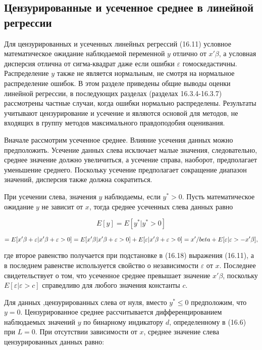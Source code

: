 \subsection{Цензурированные и усеченное среднее в линейной регрессии}


Для цензурированных и усеченных линейных регрессий (16.11) условное математическое ожидание наблюдаемой переменной $y$ отлично от $x'\beta$, а условная дисперсия отлична от сигма-квадрат даже если ошибки $\varepsilon$ гомоскедастичны. Распределение $y$ также не является нормальным, не смотря на нормальное распределение ошибок. В этом разделе приведены общие выводы оценки линейной регрессии, в последующих разделах (разделах 16.3.4-16.3.7) рассмотрены частные случаи, когда ошибки нормально распределены. Результаты учитывают цензурирование и усечение и являются основой для методов, не входящих в группу методов максимального правдоподобия оценивания.

Вначале рассмотрим усеченное среднее. Влияние усечения данных можно предположить. Усечение данных слева исключает малые значения, следовательно, среднее значение должно увеличиться, а усечение справа, наоборот, предполагает уменьшение среднего. Поскольку усечение предполагает сокращение диапазон значений, дисперсия также должна сократиться.

При усечении слева, значения $y$ наблюдаемы, если $y^{*}>0$. Пусть математическое ожидание $y$ не зависит от $x$, тогда среднее усеченных слева данных равно

\begin{equation}
E[y]=E[y^{*}|y^{*}>0]
\end{equation}

\[
=E[x'\beta+\varepsilon|x'\beta+\varepsilon>0]\\
=E[x'\beta|x'\beta+\varepsilon>0]+E[\varepsilon|x'\beta+\varepsilon>0]\\
=x'/beta+E[\varepsilon|\varepsilon>-x'\beta],
\]

где второе равенство получается при подстановке в (16.18) выражения (16.11), а в последнем равенстве используется свойство о независимости $\varepsilon$ от $x$. Последнее свидетельствует о том, что усеченное среднее превышает значение $x'\beta$, поскольку $E[\varepsilon|\varepsilon>c]$ справедливо для любого значения константы $c$.

Для данных ,цензурированных слева от нуля, вместо $y^{*}{\leq}0$ предположим, что $y=0$. Цензурированное среднее рассчитывается дифференцированием наблюдаемых значений $y$ по бинарному индикатору $d$, определенному в (16.6) при $L=0$. При отсутствии зависимости от $x$, среднее значение слева цензурированных данных равно:


